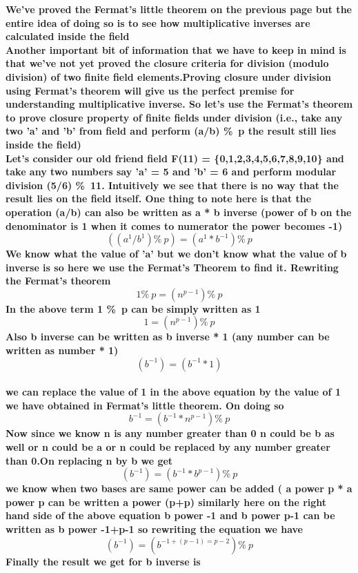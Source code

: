 \documentclass{article}
\begin{document}
\pagebreak
\textbf{We've proved the Fermat's little theorem on the previous page but the entire idea  of doing so is to see how multiplicative inverses are calculated inside the field 
\\
Another important bit of information that we have to keep in mind is that we've not yet proved the closure criteria for division (modulo division) of two finite field elements.Proving closure under division using Fermat's theorem will give us the perfect premise for understanding multiplicative inverse. So let's use the Fermat's theorem to prove closure property of finite fields under division (i.e., take any two 'a' and 'b' from field and perform (a/b) \%\ p the result still lies inside the field)}
\\
\textbf{Let's consider our old friend field F(11) = \{0,1,2,3,4,5,6,7,8,9,10\} and take any two numbers say 'a' = 5 and 'b' = 6 and perform modular division (5/6) \%\ 11. Intuitively we see that there is no way that the result lies on the field itself. One thing to note here is that the operation (a/b) can also be written as a * b inverse (power of b on the denominator is 1 when it comes to numerator the power becomes -1)}
\textbf{\[((a^{1}/b^{1})\%\ p) = (a^{1}* b ^{-1}) \%\ p \]}
\textbf{We know what the value of 'a'   but we don't know what the value of b inverse  is so here we use the Fermat's Theorem to find it. Rewriting the Fermat's theorem  }
\\
\textbf{\[ 1 \%\ p = (n ^{p-1}) \%\ p \]}
\textbf{ In the above term 1 \%\ p can be simply written as 1 }
\textbf{\[ 1  = (n ^{p-1}) \%\ p \]}
\textbf{Also b inverse can be written as b inverse * 1 (any number can be written as number * 1)}
\textbf{\[ (b^{-1}) =  (b^{-1} *1)  \]}
\\
\textbf{we can replace the value of 1 in the above equation by the value of 1 we have obtained in Fermat's little theorem. On doing so  }
\textbf{ \[ b^{-1} =(b^{-1} *  n ^{p-1})  \%\ p \] }
\textbf{Now since we know n is any number greater than 0 n could be b  as well or n could be a or  n could be replaced by any number greater than 0.On replacing n by b we get }
\pagebreak
\textbf {\[ (b^{-1}) = (b^{-1} * b^{p-1}) \%\ p \]  }
\textbf{we know when two bases are same power can be added ( a power p * a power p can be written a  power (p+p) similarly  here on the right hand side of the above equation  b power -1 and b power p-1 can be written as b power -1+p-1 so rewriting the equation we have }
\textbf {\[ (b^{-1}) = (b ^{-1 + (p-1) = p-2}) \%\ p \]}
\textbf {Finally the result we get for b inverse is }
\end{document}
